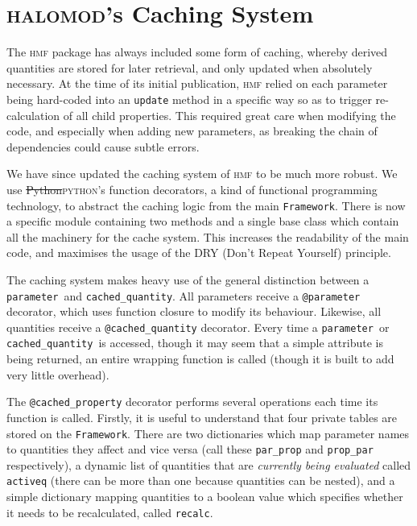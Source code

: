 \documentclass[5p,aas_macros]{elsarticle}
\newcommand{\python}{\textsc{python}\xspace} %
\newcommand{\framework}{\texttt{Framework}\xspace} %
\newcommand{\parameter}{\texttt{parameter}\xspace} %
\newcommand{\cached}{\texttt{cached\_quantity}\xspace} %
\providecommand{\DIFdeltex}[1]{{\protect\color{red}\sout{#1}}}                      %
\providecommand{\DIFaddbegin}{} %
\providecommand{\DIFaddend}{} %
\providecommand{\DIFdelbegin}{} %
\providecommand{\DIFdelend}{} %
\providecommand{\DIFdel}[1]{\texorpdfstring{\DIFdeltex{#1}}{}} %
\begin{document}


\appendix

\section{\textsc{halomod}'s Caching System}
\label{app:caching}

The \textsc{hmf} package has always included some form of caching, whereby derived quantities are stored for later retrieval, and only updated when absolutely necessary. At the time of its initial publication, \textsc{hmf} relied on each parameter being hard-coded into an \verb|update| method in a specific way so as to trigger re-calculation of all child properties. This required great care when modifying the code, and especially when adding new parameters, as breaking the chain of dependencies could cause subtle errors. 

We have since updated the caching system of \textsc{hmf} to be much more robust. We use \DIFdelbegin \DIFdel{Python}\DIFdelend \DIFaddbegin \python\DIFaddend 's function decorators, a kind of functional programming technology, to abstract the caching logic from the main \framework. There is now a specific module containing two methods and a single base class which contain all the machinery for the cache system. This increases the readability of the main code, and maximises the usage of the DRY (Don't Repeat Yourself) principle. 

The caching system makes heavy use of the general distinction between a \parameter\ and \cached. All parameters receive a \verb|@parameter| decorator, which uses function closure to modify its behaviour. Likewise, all quantities receive a \verb|@cached_quantity| decorator.
Every time a \parameter\ or \cached\ is accessed, though it may seem that a simple attribute is being returned, an entire wrapping function is called (though it is built to add very little overhead).

The \verb|@cached_property| decorator performs several operations each time its function is called. Firstly, it is useful to understand that four private tables are stored on the \framework. There are two dictionaries which map parameter names to quantities they affect and vice versa (call these \verb|par_prop| and \verb|prop_par| respectively), a dynamic list of quantities that are \textit{currently being evaluated} called \verb|activeq| (there can be more than one because quantities can be nested), and a simple dictionary mapping quantities to a boolean value which specifies whether it needs to be recalculated, called \verb|recalc|.
\end{document}
